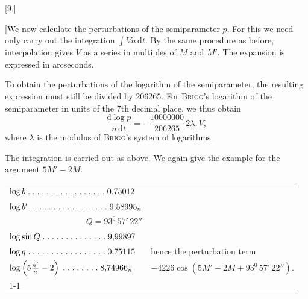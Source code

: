 \clearpage
\begin{landscape}
\begingroup
\fontsize{10}{13}\selectfont
{}
\renewcommand{\headrulewidth}{0pt}
\begin{center}[9.]\end{center}
\par\noindent\hspace*{\parindent}[We now calculate the perturbations of the semiparameter \(p\). For this we need only carry out the integration \(\int Vn\,\mathrm{d}t\). By the same procedure as before, interpolation gives \(V\) as a series in multiples of \(M\) and \(M'\). The expansion is expressed in arcseconds.
\par\noindent\hspace*{\parindent}To obtain the perturbations of the logarithm of the semiparameter, the resulting expression must still be divided by \(206265\). For \textsc{Brigg}'s logarithm of the semiparameter in units of the 7th decimal place, we thus obtain
\[
\frac{\mathrm{d}\log p}{n\,\mathrm{d}t}=-\frac{10000000}{206265}\,2\lambda\mathord{.}\,V,
\]
\noindent where \(\lambda\) is the modulus of \textsc{Brigg}'s system of logarithms.
\par\noindent\hspace*{\parindent}The integration is carried out as above. We again give the example for the argument \(5M'-2M\).
\begingroup
\newcommand{\VNinePoint}{\mathord{.}\mkern5mu}
\newcommand{\VNineFive}{\VNinePoint\VNinePoint\VNinePoint\VNinePoint\VNinePoint}
\begin{center}
\begin{tabular}{@{}l@{\quad}l@{}}
\(\log b\;\VNineFive\VNineFive\VNineFive\VNinePoint\VNinePoint0{,}75012\)&\\
\(\log b'\;\VNineFive\VNineFive\VNineFive\VNinePoint\VNinePoint9{,}58995_n\)&\\
\multicolumn{1}{r}{\(Q=93^0\,57'\,22''\)}&\\
\(\log\sin Q\;\VNineFive\VNineFive\VNinePoint\VNinePoint\VNinePoint\VNinePoint9{,}99897\)&\\
\(\log q\;\VNineFive\VNineFive\VNineFive\VNinePoint\VNinePoint0{,}75115\)&hence the perturbation term\\
\(\log\left(5\frac{n'}{n}-2\right)\;\VNineFive\VNinePoint\VNinePoint\VNinePoint8{,}74966_n\)&\(-4226\cos(5M'-2M+93^0\,57'\,22'').\)\\
\cline{1-1}
\multicolumn{1}{r}{\(2{,}00149_n\)}&\\[3pt]

\end{tabular}
\end{center}
\end{landscape}

